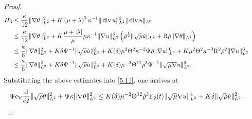 \documentclass[11pt]{article}
\DeclareMathOperator{\divv}{div}
\newcommand{\na}{\nabla}
\begin{document}
\begin{proof}
\begin{align*}
H_3
& \leq \frac{\kappa}{12} \|\nabla \theta \|_{L^2}^2 + K \left(\mu + \lambda \right)^2 \kappa^{-1} \|\divv u\|_{L^2}^3 \|\divv u\|_{L^6}\\
& \leq \frac{\kappa}{12} \|\nabla \theta \|_{L^2}^2 + K \frac{\mu + |\lambda| }{\mu} \mu \kappa^{-1} \|\na u\|_{L^2}^3 \left( \bar{\rho}^{\frac{1}{2}} \|\sqrt{\rho} \dot{u}\|_{L^2} + {\rm R} \bar{\rho} \|\nabla \theta \|_{L^2} \right)\\
& \leq \frac{\kappa}{6} \|\nabla \theta \|_{L^2}^2 + K \delta \Psi^{-1} \|\sqrt{\rho} \dot{u}\|_{L^2}^2 + K (\delta) \mu^2 \Theta^2 \kappa^{-2} \Psi \bar{\rho} \|\na u\|_{L^2}^6 + K \mu^2 \Theta^2 \kappa^{-3} {\rm R}^2 \bar{\rho}^2 \|\na u\|_{L^2}^6 \\
& \leq \frac{\kappa}{6} \|\nabla \theta \|_{L^2}^2 + K \delta \Psi^{-1} \|\sqrt{\rho} \dot{u}\|_{L^2}^2 +  K (\delta) \mu^{-2} \Theta^{12} \bar{\rho}^3 \Psi^{-1} \|\sqrt{\mu}\na u\|_{L^2}^6.
\end{align*}
Substituting the above estimates into \eqref{5.11}, one arrives at
\begin{equation}\label{5.13}
\Psi {\rm c_V} \frac{\mathrm{d}}{\mathrm{d} t} \|\sqrt{\rho} \theta \|_{L^2}^2 + \Psi \kappa \|\nabla \theta \|_{L^2}^2 \leq K (\delta) \mu^{-2} \Theta^{12} \bar{\rho}^3 \mathbb{F}_2 (t) \|\sqrt{\mu}\na u\|_{L^2}^4 + K \delta \|\sqrt{\rho} \dot{u}\|_{L^2}^2.
\end{equation}


\end{proof}
\end{document}
